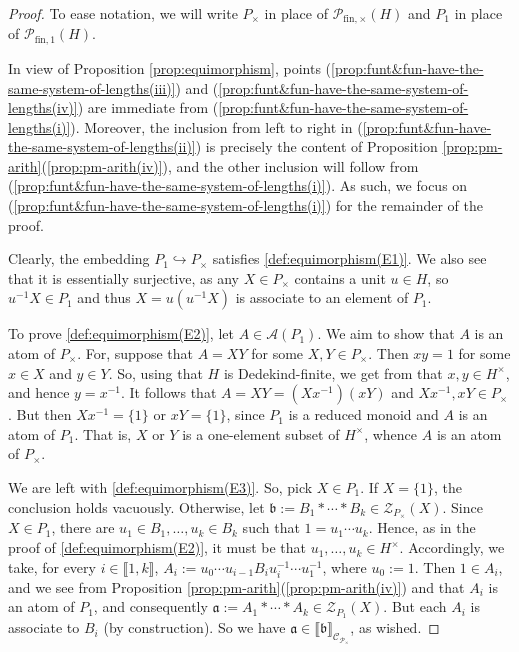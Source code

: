 \documentclass{report}
\newcommand{\llb}{\llbracket}
\newcommand{\rrb}{\rrbracket}
\newcommand{\fin}{\textrm{fin}}
\renewcommand{\:}{\text{:}}
\theoremstyle{definition}
\begin{document}
\begin{proof}
	To ease notation, we will write $P_\times$ in place of $\mathcal P_{\fin,\times}(H)$ and $P_1$ in place of $\mathcal P_{\fin,1}(H)$.
	
	In view of Proposition \ref{prop:equimorphism}, points (\ref{prop:funt&fun-have-the-same-system-of-lengths(iii)}) and (\ref{prop:funt&fun-have-the-same-system-of-lengths(iv)}) are immediate from (\ref{prop:funt&fun-have-the-same-system-of-lengths(i)}).
	Moreover, the inclusion from left to right in (\ref{prop:funt&fun-have-the-same-system-of-lengths(ii)}) is precisely the content of Proposition \ref{prop:pm-arith}(\ref{prop:pm-arith(iv)}), and the other inclusion will follow from (\ref{prop:funt&fun-have-the-same-system-of-lengths(i)}).
	As such, we focus on (\ref{prop:funt&fun-have-the-same-system-of-lengths(i)}) for the remainder of the proof.
	
	Clearly, the embedding $P_1\hookrightarrow P_\times$ satisfies \ref{def:equimorphism(E1)}.
	We also see that it is essentially surjective, as any $X\in P_\times$ contains a unit $u \in H$, so $u^{-1}X\in P_1$ and thus $X = u(u^{-1}X)$ is associate to an element of $P_1$.
 
	To prove \ref{def:equimorphism(E2)}, let $A\in\mathscr{A}(P_1)$.
	We aim to show that $A$ is an atom of $P_\times$. For, suppose that $A = XY$ for some $X,Y\in P_\times$. Then
	$xy=1$ for some $x \in X$ and $y \in Y$. So, using that $H$ is Dedekind-finite, we get from \cite[Lemma 2.2(i)]{fan-tringali18} that $x,y\in H^\times$, and hence $y=x^{-1}$.
	It follows that $A = XY = (Xx^{-1})(xY)$ and $Xx^{-1}, xY\in P_\times$. But then
	$Xx^{-1} = \{1\}$ or $xY = \{1\}$, since $P_1$ is a reduced monoid and $A$ is an atom of $P_1$.
	That is, $X$ or $Y$ is a one-element subset of $H^\times$, whence $A$ is an atom of $P_\times$. 
	
	We are left with \ref{def:equimorphism(E3)}. So, pick $X \in P_1$. If $X = \{1\}$, the conclusion holds vacuously. Otherwise,  let $\mathfrak{b} := B_1*\cdots*B_k\in \mathcal{Z}_{P_\times}(X)$. Since $X\in P_1$, there are $u_1\in B_1,\ldots, u_k\in B_k$ such that $1=u_1\cdots u_k$.
	Hence, as in the proof of \ref{def:equimorphism(E2)}, it must be that $u_1,\ldots, u_k\in H^\times$.
	Accordingly, we take, for every $i \in \llb 1, k \rrb$, $A_i := u_0 \cdots u_{i-1} B_i u_i^{-1} \cdots u_1^{-1}$, where $u_0 := 1$.
	Then $1 \in A_i$, and we see from Proposition \ref{prop:pm-arith}(\ref{prop:pm-arith(iv)}) and \cite[Proposition 2.2(ii)]{fan-tringali18} that $A_i$ is an atom of $P_1$, and consequently $\mathfrak{a}:= A_1*\cdots * A_k \in \mathcal{Z}_{P_1}(X)$.
	But each $A_i$ is associate to $B_i$ (by construction). So we have  $\mathfrak{a}\in \llb \mathfrak{b} \rrb_{\mathscr{C_{P_\times}}}$, as wished.
%	
\end{proof}
\end{document}
